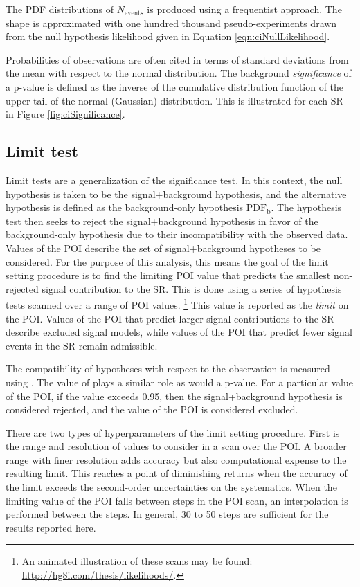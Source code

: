 The PDF distributions of $N_\text{events}$ is produced using a frequentist approach.
The shape is approximated with one hundred thousand pseudo-experiments drawn from the null hypothesis likelihood given in Equation \ref{eqn:ciNullLikelihood}.

Probabilities of observations are often cited in terms of standard deviations from the mean with respect to the normal distribution.
The background \emph{significance} of a p-value is defined as the inverse of the cumulative distribution function of the upper tail of the normal (Gaussian) distribution.
This is illustrated for each SR in Figure \ref{fig:ciSignificance}.

\subsection{Limit test}\label{sec:ciLimitSetting}

Limit tests are a generalization of the significance test. %
In this context, the null hypothesis is taken to be the signal+background hypothesis, and the alternative hypothesis is defined as the background-only hypothesis $\text{PDF}_\text{b}$.
The hypothesis test then seeks to reject the signal+background hypothesis in favor of the background-only hypothesis due to their incompatibility with the observed data.
Values of the POI describe the set of signal+background hypotheses to be considered.
For the purpose of this analysis, this means the goal of the limit setting procedure is to find the limiting POI value that predicts the smallest non-rejected signal contribution to the SR.
This is done using a series of hypothesis tests scanned over a range of POI values. \footnote{An animated illustration of these scans may be found: \url{http://hg8i.com/thesis/likelihoods/}.}
This value is reported as the \emph{limit} on the POI.
Values of the POI that predict larger signal contributions to the SR describe excluded signal models, while values of the POI that predict fewer signal events in the SR remain admissible.

The compatibility of hypotheses with respect to the observation is measured using \cls.
The value of \cls plays a similar role as would a p-value.
For a particular value of the POI, if the \cls value exceeds 0.95, then the signal+background hypothesis is considered rejected, and the value of the POI is considered excluded.

There are two types of hyperparameters of the limit setting procedure.
First is the range and resolution of values to consider in a scan over the POI.
A broader range with finer resolution adds accuracy but also computational expense to the resulting limit.
This reaches a point of diminishing returns when the accuracy of the limit exceeds the second-order uncertainties on the systematics.
When the limiting value of the POI falls between steps in the POI scan, an interpolation is performed between the steps.
In general, 30 to 50 steps are sufficient for the results reported here.

